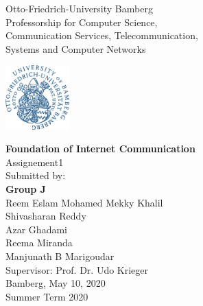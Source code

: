 
\thispagestyle{empty}
\begin{center}
\begin{minipage}{0.7\textwidth}
\centering
\footnotesize{Otto-Friedrich-University Bamberg}\\
	\vspace{0.3cm}
\normalsize{Professorship for Computer Science,
	\\Communication Services, Telecommunication,
 	\\Systems and Computer Networks}
\end{minipage}
\begin{minipage}{0.1\textwidth}\raggedleft
\includegraphics[width=70pt]{Images/UMI-LOGO.png}
\end{minipage}




	


	\vspace{1cm}
	\doublespacing
	{\textbf{Foundation of Internet Communication}}\\
	\singlespacing
	{\normalsize{Assignement1}}\\
    \vfill
    \footnotesize{Submitted by:}\\
    \textbf{Group J}\\
    \vspace{0.5cm}
     \normalsize{Reem Eslam Mohamed Mekky Khalil}\\
      \normalsize{Shivasharan Reddy}\\
     \normalsize{Azar Ghadami}\\
     \normalsize{Reema Miranda}\\
     \normalsize{Manjunath B Marigoudar}\\

     \vspace{0.5cm}
     \small{Supervisor: Prof. Dr. Udo Krieger}\\
     \vspace{0.5cm}
     \footnotesize{Bamberg, May 10, 2020}\\
    \footnotesize{Summer Term 2020}
 

 
\end{center}
\clearpage

\clearpage

